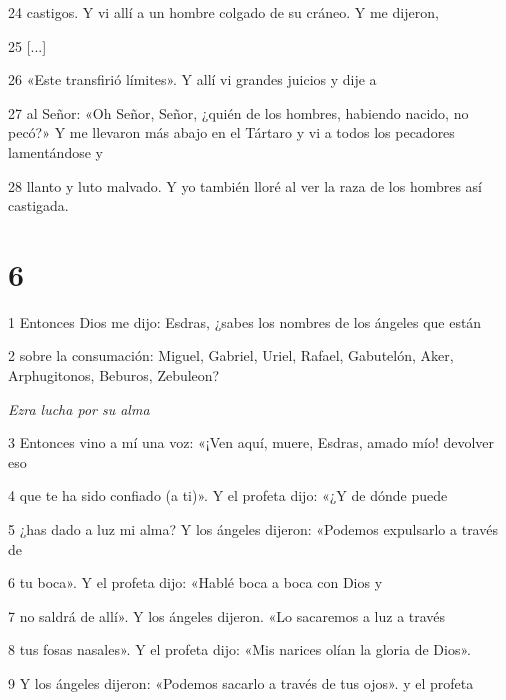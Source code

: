 \par 24 castigos. Y vi allí a un hombre colgado de su cráneo. Y me dijeron,

\par 25 [...]

\par 26 «Este transfirió límites». Y allí vi grandes juicios y dije a

\par 27 al Señor: «Oh Señor, Señor, ¿quién de los hombres, habiendo nacido, no pecó?» Y me llevaron más abajo en el Tártaro y vi a todos los pecadores lamentándose y

\par 28 llanto y luto malvado. Y yo también lloré al ver la raza de los hombres así castigada.

\chapter{6}

\par 1 Entonces Dios me dijo: Esdras, ¿sabes los nombres de los ángeles que están

\par 2 sobre la consumación: Miguel, Gabriel, Uriel, Rafael, Gabutelón, Aker, Arphugitonos, Beburos, Zebuleon?

\par \textit{Ezra lucha por su alma}

\par 3 Entonces vino a mí una voz: «¡Ven aquí, muere, Esdras, amado mío! devolver eso

\par 4 que te ha sido confiado (a ti)». Y el profeta dijo: «¿Y de dónde puede

\par 5 ¿has dado a luz mi alma? Y los ángeles dijeron: «Podemos expulsarlo a través de

\par 6 tu boca». Y el profeta dijo: «Hablé boca a boca con Dios y

\par 7 no saldrá de allí». Y los ángeles dijeron. «Lo sacaremos a luz a través

\par 8 tus fosas nasales». Y el profeta dijo: «Mis narices olían la gloria de Dios».

\par 9 Y los ángeles dijeron: «Podemos sacarlo a través de tus ojos». y el profeta

